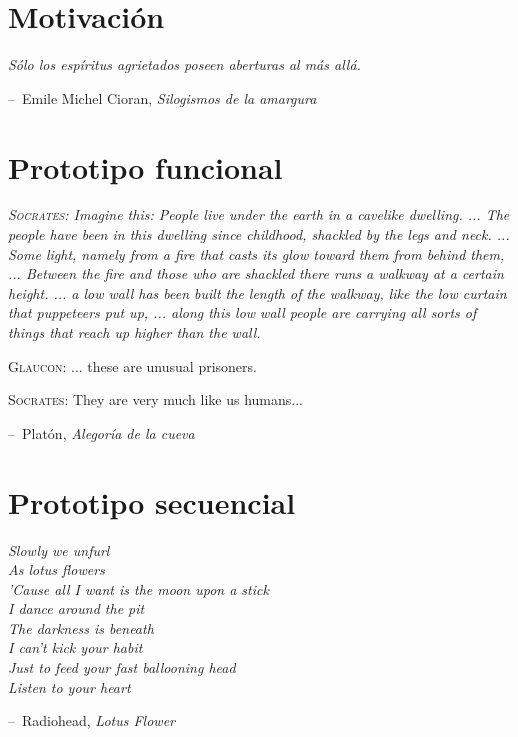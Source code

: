 \documentclass[12pt,letterpaper,titlepage,oneside,openright]{book}
\makeatletter
\newenvironment{chapquote}[2][2em]
  {\setlength{\@tempdima}{#1}%
   \def\chapquote@author{#2}%
   \parshape 1 \@tempdima \dimexpr\textwidth-2\@tempdima\relax%
   \itshape}
  {\par\vspace{.5em}\normalfont\hfill--\ \chapquote@author\hspace*{\@tempdima}\par\bigskip}
\makeatother
\begin{document}
\lipsum[1-2]

\chapter{Motivación}

\begin{chapquote}{Emile Michel Cioran, \textit{Silogismos de la amargura}}
Sólo los espíritus agrietados poseen aberturas al más allá.
\end{chapquote}

\lipsum[1-2]

\chapter{Prototipo funcional}

\begin{chapquote}{Platón, \textit{Alegoría de la cueva}}
\textsc{Socrates}: Imagine this: People live under the earth in a cavelike dwelling. ... The people have been in this dwelling since childhood, shackled by the legs and neck. ... Some light, namely from a fire that casts its glow toward them from behind them, ... Between the fire and those who are shackled there runs a walkway at a certain height. ... a low wall has been built the length of the walkway, like the low curtain that puppeteers put up, ... along this low wall people are carrying all sorts of things that reach up higher than the wall.

\vspace{1em}

\textsc{Glaucon}: ... these are unusual prisoners.

\textsc{Socrates}: They are very much like us humans...
\end{chapquote}

\lipsum[1-2]

\chapter{Prototipo secuencial}

\begin{chapquote}{Radiohead, \textit{Lotus Flower}}
\noindent Slowly we unfurl\\
As lotus flowers\\
'Cause all I want is the moon upon a stick\\
I dance around the pit\\
The darkness is beneath\\
I can't kick your habit\\
Just to feed your fast ballooning head\\
Listen to your heart
\end{chapquote}

\lipsum[1-2]
\end{document}
